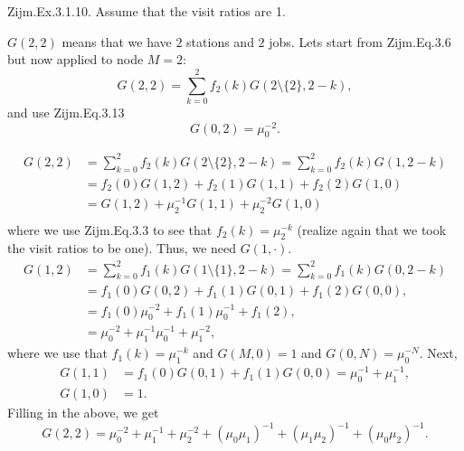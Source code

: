 \begin{question}
Zijm.Ex.3.1.10. Assume that the visit ratios are 1.
\begin{solution}
  $G(2,2)$ means that we have $2$ stations and $2$ jobs. Lets start
  from Zijm.Eq.3.6 but now applied to node $M=2$:
\begin{equation*}
  G(2,2)=\sum_{k=0}^2 f_2(k)G(2\setminus\{2\} , 2-k),
\end{equation*}
and use Zijm.Eq.3.13
\begin{equation*}
  G(0,2) = \mu_0^{-2}.
\end{equation*}

\begin{equation*}
  \begin{split}
  G(2,2)
&=\sum_{k=0}^2 f_2(k)G(2\setminus\{2\} , 2-k) = \sum_{k=0}^2 f_2(k)G(1 , 2-k) \\
& = f_2(0) G(1,2) + f_2(1)G(1,1) + f_2(2) G(1,0) \\
& =  G(1,2) + \mu_2^{-1}G(1,1) + \mu_2^{-2} G(1,0) \\
  \end{split}
\end{equation*}
where we use Zijm.Eq.3.3 to see that $f_2(k) = \mu_2^{-k}$ (realize
again that we took the visit ratios to be one).  Thus, we need
$G(1,\cdot)$.
\begin{align*}
  G(1,2)
&=\sum_{k=0}^2 f_1(k)G(1\setminus\{1\} , 2-k) = \sum_{k=0}^2 f_1(k)G(0 , 2-k) \\
& = f_1(0) G(0,2) + f_1(1) G(0,1)  + f_1(2)G(0,0), \\
& = f_1(0) \mu_0^{-2} + f_1(1) \mu_0^{-1} + f_1(2), \\
&= \mu_0^{-2} + \mu_1^{-1} \mu_0^{-1} + \mu_1^{-2},
\end{align*}
where we use that $f_1(k) = \mu_1^{-k}$ and $G(M,0)=1$ and $G(0,N) = \mu_0^{-N}$. 
Next, 
\begin{align*}
G(1,1) &= f_1(0)G(0,1) + f_1(1)G(0,0) = \mu_0^{-1} + \mu_1^{-1},\\
G(1,0) &= 1.
\end{align*}
Filling in the above, we get
\begin{equation*}
  G(2,2) = \mu_0^{-2}+\mu_1^{-1}+\mu_2^{-2} + (\mu_0\mu_1)^{-1} + (\mu_1\mu_2)^{-1} + (\mu_0\mu_2)^{-1}.
\end{equation*}
\end{solution}
\end{question}


